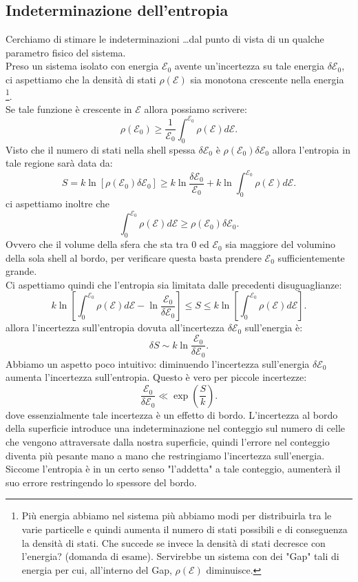 \subsection{Indeterminazione dell'entropia}%
Cerchiamo di stimare le indeterminazioni \ldots dal punto di vista di un qualche parametro fisico del sistema.\\
Preso un sistema isolato con energia $\mathcal{E} _0$ avente un'incertezza su tale energia $\delta \mathcal{E} _0$, ci aspettiamo che la densità di stati $\rho ( \mathcal{E} ) $ sia monotona crescente nella energia \footnote{Più energia abbiamo nel sistema più abbiamo modi per distribuirla tra le varie particelle e quindi aumenta il numero di stati possibili e di conseguenza la densità di stati. Che succede se invece la densità di stati decresce con l'energia? (domanda di esame). Servirebbe un sistema con dei "Gap" tali di energia per cui, all'interno del Gap, $\rho ( \mathcal{E} ) $ diminuisce.}. \\
Se tale funzione è crescente in $\mathcal{E} $ allora possiamo scrivere:
\[
	\rho ( \mathcal{E}_{0}) \ge \frac{1}{\mathcal{E} _{0}} \int_{0}^{\mathcal{E}_{0}} \rho( \mathcal{E} ) d\mathcal{E}   
.\] 
Visto che il numero di stati nella shell spessa $\delta \mathcal{E} _{0}$ è $\rho ( \mathcal{E} _{0}) \delta \mathcal{E} _{0}$ allora l'entropia in tale regione sarà data da:
\[
	S = k\ln\left[ \rho ( \mathcal{E} _{0}) \delta \mathcal{E} _{0} \right] \ge
	k\ln \frac{\delta \mathcal{E} _{0}}{\mathcal{E} _{0}} + k\ln \int_{0}^{\mathcal{E} _{0}}\rho ( \mathcal{E} ) d\mathcal{E} 
.\] 
ci aspettiamo inoltre che
\[
	\int_{0}^{\mathcal{E} _{0}}  \rho ( \mathcal{E} ) d\mathcal{E} \ge \rho ( \mathcal{E} _{0}) \delta \mathcal{E} _{0}
.\] 
Ovvero che il volume della sfera che sta tra $0$ ed $\mathcal{E} _{0}$ sia maggiore del volumino della sola shell al bordo, per verificare questa basta prendere $\mathcal{E} _{0}$ sufficientemente grande.\\
Ci aspettiamo quindi che l'entropia sia limitata dalle precedenti disuguaglianze:
\[
	k\ln\left[ \int_{0}^{\mathcal{E} _{0}} \rho ( \mathcal{E} ) d\mathcal{E} - \ln \frac{\mathcal{E} _{0}}{\delta \mathcal{E} _{0}} \right] 
	\le S 
	\le k \ln\left[ \int_{0}^{\mathcal{E} _{0}} \rho ( \mathcal{E} ) d\mathcal{E}   \right] 
.\] 
allora l'incertezza sull'entropia dovuta all'incertezza $\delta \mathcal{E} _{0}$ sull'energia è:
\[
	\delta  S \sim k\ln \frac{\mathcal{E} _{0}}{\delta \mathcal{E} _{0}}
.\] 
Abbiamo un aspetto poco intuitivo: diminuendo l'incertezza sull'energia $\delta  \mathcal{E}_{0}$ aumenta l'incertezza sull'entropia. Questo è vero per piccole incertezze:
\[
	\frac{\mathcal{E} _{0}}{\delta  \mathcal{E} _{0}} \ll \exp\left( \frac{S}{k} \right)  
.\]
dove essenzialmente tale incertezza è un effetto di bordo. 
L'incertezza al bordo della superficie introduce una indeterminazione nel conteggio sul numero di celle che vengono attraversate dalla nostra superficie, quindi l'errore nel conteggio diventa più pesante mano a mano che restringiamo l'incertezza sull'energia. 
Siccome l'entropia è in un certo senso "l'addetta" a tale conteggio, aumenterà il suo errore restringendo lo spessore del bordo.\\
